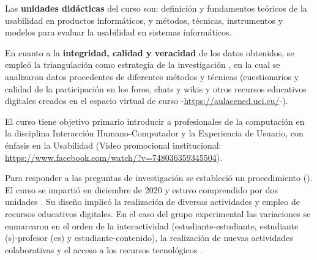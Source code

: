 \documentclass{textolivre}
\begin{document}
Las \textbf{unidades didácticas} del curso son: definición y fundamentos teóricos de la usabilidad en productos informáticos, y métodos, técnicas, instrumentos y modelos para evaluar la usabilidad en sistemas informáticos.

En cuanto a la \textbf{integridad, calidad y veracidad} de los datos obtenidos, se empleó la triangulación como estrategia de la investigación \cite{luo2018}, %
en la cual se analizaron datos procedentes de diferentes métodos y técnicas (cuestionarios y calidad de la participación en los foros, chats y wikis y otros recursos educativos digitales creados en el espacio virtual de curso -\url{https://aulacened.uci.cu/}-).

El curso tiene objetivo primario introducir a profesionales de la computación en la disciplina Interacción Humano-Computador y la Experiencia de Usuario, con énfasis en la Usabilidad (Video promocional institucional: \url{https://www.facebook.com/watch/?v=748036359345504}).

Para responder a las preguntas de investigación se estableció un procedimiento (). El curso  se impartió en diciembre de 2020 y estuvo comprendido por dos unidades . Su diseño implicó la realización de diversas actividades y empleo de recursos educativos digitales. En el caso del grupo experimental las variaciones se enmarcaron en el orden de la interactividad (estudiante-estudiante, estudiante (s)-profesor (es) y estudiante-contenido), la realización de nuevas actividades colaborativas y el acceso a los recursos tecnológicos .
\end{document}
